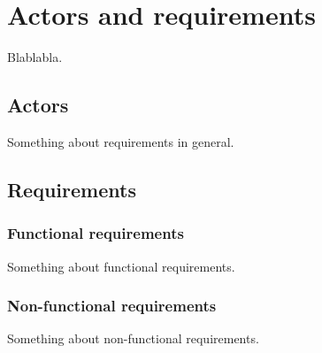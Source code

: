 \chapter{Actors and requirements}
Blablabla.

\section{Actors}
Something about requirements in general.

\section{Requirements}

\subsection{Functional requirements}
Something about functional requirements.

\subsection{Non-functional requirements}
Something about non-functional requirements.
